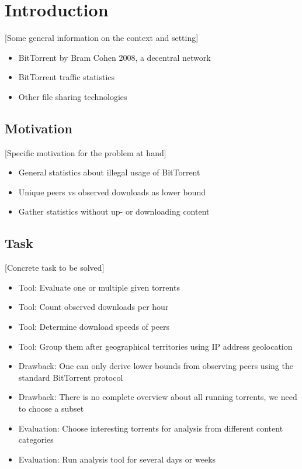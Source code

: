 \documentclass[10pt, a4paper, twoside]{scrartcl}
\renewcommand{\_}{\origunderscore\allowbreak}
\begin{document}
\listoftables
\cleardoublepage

\section{Introduction}
[Some general information on the context and setting]

\begin{itemize}
  \item BitTorrent by Bram Cohen 2008, a decentral network
  \item BitTorrent traffic statistics
  \item Other file sharing technologies
\end{itemize}

\subsection{Motivation}
[Specific motivation for the problem at hand]

\begin{itemize}
  \item General statistics about illegal usage of BitTorrent
  \item Unique peers vs observed downloads as lower bound
  \item Gather statistics without up- or downloading content
\end{itemize}

\subsection{Task}
[Concrete task to be solved]

\begin{itemize}
  \item Tool: Evaluate one or multiple given torrents
  \item Tool: Count observed downloads per hour
  \item Tool: Determine download speeds of peers
  \item Tool: Group them after geographical territories using IP address geolocation
  \item Drawback: One can only derive lower bounds from observing peers using the standard BitTorrent protocol
  \item Drawback: There is no complete overview about all running torrents, we need to choose a subset
  \item Evaluation: Choose interesting torrents for analysis from different content categories
  \item Evaluation: Run analysis tool for several days or weeks
\end{itemize}
\end{document}

